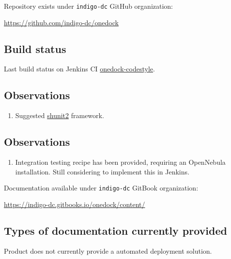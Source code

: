 \documentclass[a4wide,11pt]{article}
\begin{document}


\label{sec:repository}
Repository exists under \texttt{indigo-dc} GitHub organization: \vspace{0.1em} \begin{center}\url{https://github.com/indigo-dc/onedock}\end{center}



\label{sec:code_style}

\subsection{Build status}
Last build status on Jenkins CI
\href{https://jenkins.indigo-datacloud.eu:8080//job/onedock-codestyle/24}{onedock-codestyle}.


 
 

\label{sec:unit_test}
\subsection{Observations}
\begin{enumerate}
        \item Suggested \href{https://code.google.com/archive/p/shunit2/}{shunit2} framework.
    \end{enumerate}



\label{sec:func_int_test}
\subsection{Observations}
\begin{enumerate}
        \item Integration testing recipe has been provided, requiring an OpenNebula installation. Still considering to implement this in Jenkins.
    \end{enumerate}



\label{sec:gitbook}
Documentation available under \texttt{indigo-dc} GitBook organization: \vspace{0.1em} \begin{center}\url{https://indigo-dc.gitbooks.io/onedock/content/}\end{center} 
\subsection{Types of documentation currently provided}
\begin{center}
\end{center}



\label{sec:configuration}
Product does not currently provide a automated deployment solution. 


\newpage

\end{document}

